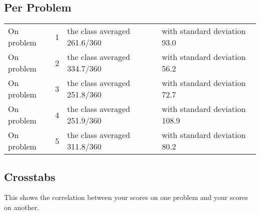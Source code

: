 \documentclass[11pt]{handout}
\begin{document}
\subsection*{Per Problem}

\begin{tabular}{l@{ }r@{ }l@{ }l}
On problem & 1 & the class averaged 261.6/360 & with standard deviation 93.0 \\
On problem & 2 & the class averaged 334.7/360 & with standard deviation 56.2 \\
On problem & 3 & the class averaged 251.8/360 & with standard deviation 72.7 \\
On problem & 4 & the class averaged 251.9/360 & with standard deviation 108.9 \\
On problem & 5 & the class averaged 311.8/360 & with standard deviation 80.2 \\
\end{tabular}

\subsection*{Crosstabs}


This shows the correlation between your scores on one problem and your scores on another.
\end{document}
